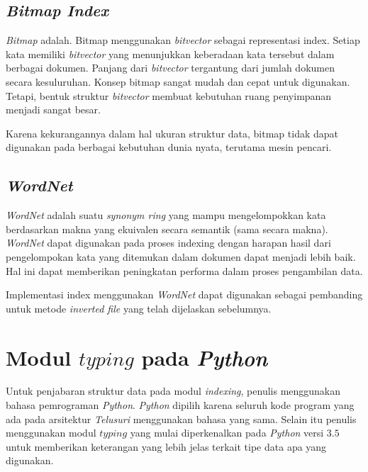 \subsection{\emph{Bitmap Index}}

\emph{Bitmap} adalah. Bitmap menggunakan \emph{bitvector} sebagai representasi
index. Setiap kata memiliki \emph{bitvector} yang menunjukkan keberadaan kata
tersebut dalam berbagai dokumen. Panjang dari \emph{bitvector} tergantung dari
jumlah dokumen secara kesuluruhan. Konsep bitmap sangat mudah dan cepat untuk
digunakan. Tetapi, bentuk struktur \emph{bitvector} membuat kebutuhan ruang
penyimpanan menjadi sangat besar.

Karena kekurangannya dalam hal ukuran struktur data, bitmap tidak dapat
digunakan pada berbagai kebutuhan dunia nyata, terutama mesin pencari.

\subsection{\emph{WordNet}}

\emph{WordNet} adalah suatu \emph{synonym ring} yang mampu mengelompokkan kata
berdasarkan makna yang ekuivalen secara semantik (sama secara makna).
\emph{WordNet} dapat digunakan pada proses indexing dengan harapan hasil dari
pengelompokan kata yang ditemukan dalam dokumen dapat menjadi lebih baik. Hal
ini dapat memberikan peningkatan performa dalam proses pengambilan data.

Implementasi index menggunakan \emph{WordNet} dapat digunakan sebagai pembanding
untuk metode \emph{inverted file} yang telah dijelaskan sebelumnya.

\section{Modul $typing$ pada \textit{Python}}

Untuk penjabaran struktur data pada modul \textit{indexing}, penulis menggunakan
bahasa pemrograman \textit{Python}. \textit{Python} dipilih karena seluruh kode
program yang ada pada arsitektur \textit{Telusuri} menggunakan bahasa yang sama.
Selain itu penulis menggunakan modul $typing$ yang mulai diperkenalkan pada
\textit{Python} versi $3.5$ untuk memberikan keterangan yang lebih jelas terkait
tipe data apa yang digunakan.
